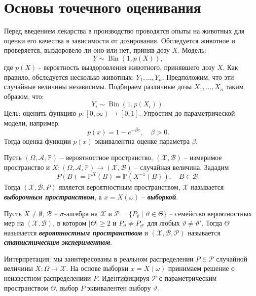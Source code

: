 \graphicspath{{./chapters/chapter02/}}
\chapter{Основы точечного оценивания}

\begin{exmp}
	Перед введением лекарства в производство проводятся опыты на животных для оценки его качества в зависимости от дозирования. Обследуется животное и проверяется, выздоровело ли оно или нет, приняв дозу $X$. Модель:
	\[Y \sim \operatorname{Bin}(1, p(X)),\]
	где $p(X)$ - вероятность выздоровления животного, принявшего дозу $X$.
	Как правило, обследуется несколько животных: $Y_1, \dots, Y_n$. Предположим, что эти случайные величины независимы. Подбираем различные дозы $X_1, \dots, X_n$ таким образом, что:
	\[Y_i \sim \operatorname{Bin}(1,p(X_i)). \]
	Цель: оценить функцию $p: \left[0, \infty \right) \rightarrow [0, 1]$. Упростим до параметрической модели, например: \[p(x)=1-e^{-\beta x}, \quad \beta>0 .\]
	Тогда оценка функции $p(x)$ эквивалентна оценке параметра $\beta$.
\end{exmp}

\begin{asmp}
	Пусть $(\Omega, \mathcal{A}, \mathbb{P})$ -- вероятностное пространство, $(\mathcal{X}, \mathcal{B})$ -- измеримое пространство и $X\colon(\Omega, \mathcal{A}, \mathbb{P}) \rightarrow (\mathcal{X}, \mathcal{B})$ -- случайная величина. Зададим
	\[P(B)=\mathbb{P}^X(B)=\mathbb{P}(X^{-1}(B)), \quad B \in \mathcal{B}.  \]
	Тогда $(\mathcal{X}, \mathcal{B}, P)$ является вероятностным пространством, $\mathcal{X}$ называется \textbf{\textit{выборочным пространством}}, а $x=X(\omega)$ -- \textbf{\textit{выборкой}}. 
\end{asmp}

\begin{defn}
	Пусть $X \neq \emptyset$, $\mathcal{B}$ -- $\sigma$-алгебра на $\mathcal{X}$ и $\mathcal{P}=\{P_\vartheta \mid \vartheta \in \Theta \}$ -- семейство вероятностных мер на $(\mathcal{X}, \mathcal{B})$, в котором $|\Theta| \geq 2$ и $P_\vartheta \neq P_{\vartheta'}$ для любых $\vartheta \neq \vartheta'$. Тогда $\Theta$ называется \textbf{\textit{вероятностным пространством}} и $(\mathcal{X}, \mathcal{B}, \mathcal{P})$ называется \textbf{\textit{статистическим экспериментом}}.
\end{defn}

\begin{rmrk}
	Интерпретация: мы заинтересованы в реальном распределении $P \in \mathcal{P}$ случайной величины $X\colon\Omega \rightarrow \mathcal{X}.$ На основе выборки $x=X(\omega)$ принимаем решение о неизвестном распределениии $P$. Идентифицируя $\mathcal{P}$ с параметрическим пространством $\Theta$, выбор $P$ эквивалентен выбору $\vartheta$.
	
\end{rmrk}


